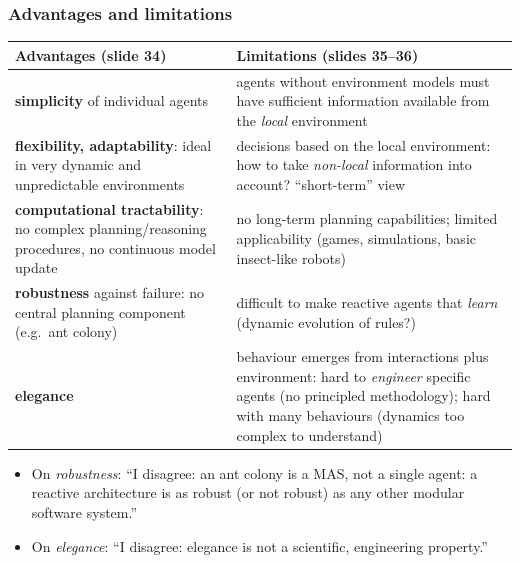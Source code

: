 \subsubsection{Advantages and limitations}

\begin{center}
\small
\begin{tabularx}{\linewidth}{@{}X X@{}}
\toprule
\textbf{Advantages (slide 34)} & \textbf{Limitations (slides 35--36)} \\
\midrule
\textbf{simplicity} of individual agents &
  agents without environment models must have sufficient information available from the
  \emph{local} environment \\
\textbf{flexibility, adaptability}: ideal in very dynamic and unpredictable environments &
  decisions based on the local environment: how to take \emph{non-local} information into
  account? ``short-term'' view \\
\textbf{computational tractability}: no complex planning/reasoning procedures, no
  continuous model update &
  no long-term planning capabilities; limited applicability (games, simulations, basic
  insect-like robots) \\
\textbf{robustness} against failure: no central planning component (e.g.\ ant colony) &
  difficult to make reactive agents that \emph{learn} (dynamic evolution of rules?) \\
\textbf{elegance} &
  behaviour emerges from interactions plus environment: hard to \emph{engineer} specific
  agents (no principled methodology); hard with many behaviours (dynamics too complex to
  understand) \\
\bottomrule
\end{tabularx}
\end{center}

\begin{nbwarning}
\begin{itemize}[nosep]
  \item On \emph{robustness}: ``I disagree: an ant colony is a MAS, not a single agent: a
        reactive architecture is as robust (or not robust) as any other modular software
        system.''
  \item On \emph{elegance}: ``I disagree: elegance is not a scientific, engineering
        property.''
\end{itemize}
\end{nbwarning}

